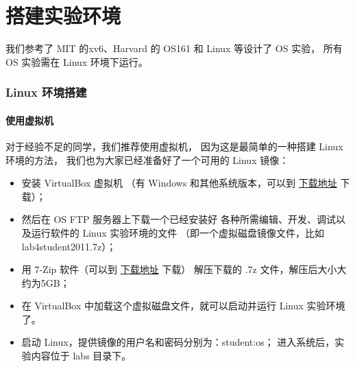 \section{搭建实验环境}

我们参考了 MIT 的xv6、Harvard 的 OS161 和 Linux 等设计了 \ucore OS 实验，
所有 OS 实验需在 Linux 环境下运行。

\subsubsection{Linux 环境搭建}

\paragraph{使用虚拟机}
对于经验不足的同学，我们推荐使用虚拟机，
因为这是最简单的一种搭建 Linux 环境的方法，
我们也为大家已经准备好了一个可用的 Linux 镜像：
\begin{small}
\begin{itemize}[label=$\triangleright$]
    \item %
        安装 VirtualBox 虚拟机
        （有 Windows 和其他系统版本，可以到
        \href{http://www.virtualbox.org/wiki/Downloads}{下载地址} 下载）；
    \item %
        然后在 OS FTP 服务器上下载一个已经安装好
        各种所需编辑、开发、调试以及运行软件的 Linux 实验环境的文件
        （即一个虚拟磁盘镜像文件，比如 lab4student2011.7z）；
    \item %
        用 7-Zip 软件（可以到 \href{http://www.7-zip.org/download.html}{下载地址} 下载）
        解压下载的 .7z 文件，解压后大小大约为5GB；
    \item %
        在 VirtualBox 中加载这个虚拟磁盘文件，就可以启动并运行 Linux 实验环境了。
    \item %
        启动 Linux，提供镜像的用户名和密码分别为：student:os；
        进入系统后，实验内容位于 labs 目录下。
\end{itemize}
\end{small}

